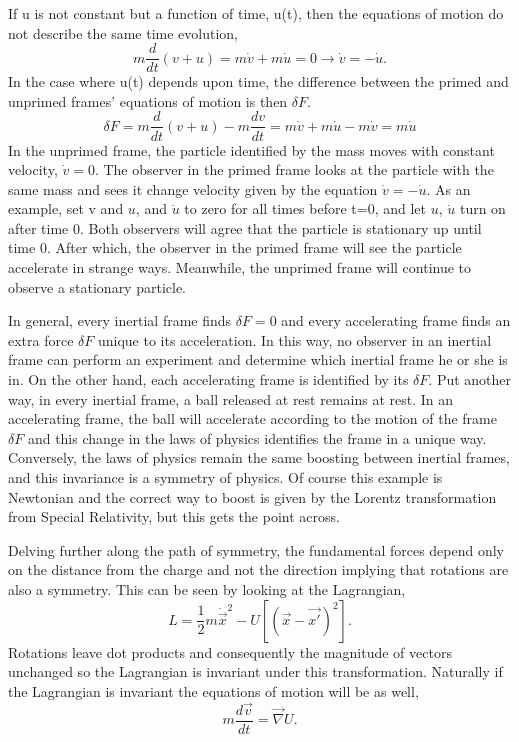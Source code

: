 If u is not constant but a function of time, u(t), then the equations of motion do not describe the same time evolution,
\begin{equation}
m\frac{d}{dt}(v+u) = m\dot{v} + m\dot{u} = 0 \rightarrow \dot{v} = -\dot{u}.
\end{equation}
In the case where u(t) depends upon time, the difference between the primed and unprimed frames' equations of motion is then $\delta F$.
\begin{equation}
\delta F = m\frac{d}{dt}(v+u) - m\frac{dv}{dt} = m\dot{v} + m\dot{u} - m\dot{v} = m\dot{u}
\end{equation}
In the unprimed frame, the particle identified by the mass moves with constant velocity, $\dot{v} = 0$. The observer in the primed frame looks at the particle with the same mass and sees it change velocity given by the equation $\dot{v} = -\dot{u}$. As an example, set v and $u$, and $\dot{u}$ to zero for all times before t=0, and let $u$, $\dot{u}$ turn on after time 0. Both observers will agree that the particle is stationary up until time 0. After which, the observer in the primed frame will see the particle accelerate in strange ways. Meanwhile, the unprimed frame will continue to observe a stationary particle. 

In general, every inertial frame finds $\delta F = 0$ and every accelerating frame finds an extra force $\delta F$ unique to its acceleration. In this way, no observer in an inertial frame can perform an experiment and determine which inertial frame he or she is in. On the other hand, each accelerating frame is identified by its $\delta F$.  Put another way, in every inertial frame, a ball released at rest remains at rest. In an accelerating frame, the ball will accelerate according to the motion of the frame $\delta F$ and this change in the laws of physics identifies the frame in a unique way. Conversely, the laws of physics remain the same boosting between inertial frames, and this invariance is a symmetry of physics. Of course this example is Newtonian and the correct way to boost is given by the Lorentz transformation from Special Relativity, but this gets the point across.

Delving further along the path of symmetry, the fundamental forces depend only on the distance from the charge and not the direction implying that rotations are also a symmetry. This can be seen by looking at the Lagrangian, 
\begin{equation}
L = \frac{1}{2} m\dot{\vec{x}}^2 - U[(\vec{x} - \vec{x'})^2].
\end{equation}
Rotations leave dot products and consequently the magnitude of vectors unchanged so the Lagrangian is invariant under this transformation. Naturally if the Lagrangian is invariant the equations of motion will be as well,
\begin{equation}
\label{eq:symvec}
m\frac{d\vec{v}}{dt} = \vec{\nabla} U.
\end{equation}

